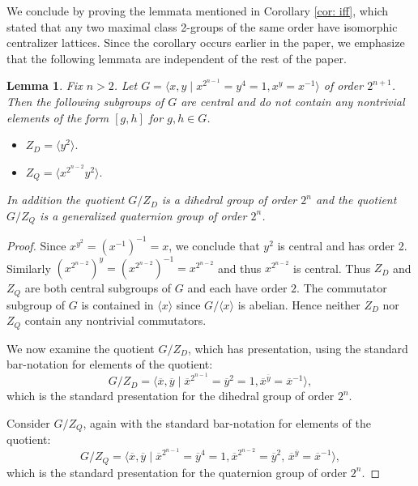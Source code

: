 \documentclass[12pt]{amsart}
\newtheorem{lemma}[theorem]{Lemma}
\begin{document}
We conclude by proving the lemmata mentioned in Corollary \ref{cor: iff}, which stated that any two maximal class 2-groups of the same order have isomorphic centralizer lattices. Since the corollary occurs earlier in the paper, we emphasize that the following lemmata are independent of the rest of the paper.
\begin{lemma}\label{lem: D_Q}
Fix $n>2$. Let $G = \langle x, y\; | \;x^{2^{{n-1}}}=y^{4} =1, x^y = x^{-1} \rangle $ of order $2^{n+1}$. Then the following subgroups of $G$ are central and do not contain any nontrivial elements of the form $[g,h]$ for $g,h\in G$. 
\begin{itemize}
    \item $Z_D = \langle y^2 \rangle.$ 
    \item $Z_Q = \langle x^{2^{n-2}} y^2 \rangle.$
\end{itemize} In addition the quotient $G/Z_D$ is a dihedral group of order $2^n$ and the quotient $G/Z_Q$ is a generalized quaternion group of order $2^n$.   
\end{lemma}
\begin{proof} 
Since $x^{y^2} = (x^{-1})^{-1} = x$, we conclude that $y^2$ is central and has order 2. Similarly $(x^{2^{n-2}})^y = ({x^{2^{n-2}}})^{-1} = x^{2^{n-2}}$ and thus $x^{2^{n-2}}$ is central. Thus $Z_D$ and $Z_Q$ are both central subgroups of $G$ and each have order $2$. The commutator subgroup of $G$ is contained in $\langle x \rangle$ since $G/\langle x \rangle$ is abelian. Hence neither $Z_D$ nor $Z_Q$ contain any nontrivial commutators. 

We now examine the quotient $G/Z_D$, which has presentation, using the standard bar-notation for elements of the quotient: \[G/Z_D = \langle \overline{x}, \overline{y} \; | \; \overline{x}^{2^{n-1}} = \overline{y}^2 = 1, \overline{x}^{\overline{y}} = \overline{x}^{-1}\rangle,\] which is the standard presentation for the dihedral group of order $2^{n}$. 

Consider $G/Z_Q$, again with the standard bar-notation for elements of the quotient: 
\[G/Z_Q = \langle \overline{x},\overline{y}\;|\; \overline{x}^{2^{n-1}} = \overline{y}^{4} = 1, \overline{x}^{2^{n-2}}=\overline{y}^2, \,\overline{x}^{\overline{y}} = \overline{x}^{-1}\rangle ,\] which is the standard presentation for the quaternion group of order $2^n$. 
\end{proof}
\end{document}
